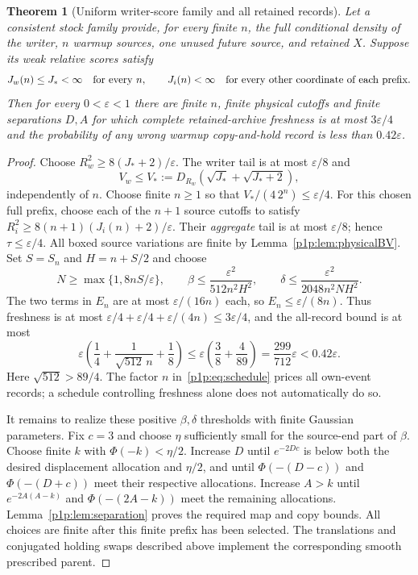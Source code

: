 \documentclass[11pt]{article}
\numberwithin{equation}{section}
\newtheorem{theorem}{Theorem}[section]
\theoremstyle{definition}
\theoremstyle{remark}
\begin{document}
\begin{theorem}[Uniform writer-score family and all retained records]
\label{p1p:thm:existence}
Let a consistent stock family provide, for every finite $n$, the full
conditional density of the writer, $n$ warmup sources, one unused future
source, and retained $X$. Suppose its weak relative scores satisfy
\[
 J_w(n)\leq J_*<\infty\quad\hbox{for every }n,
 \qquad J_i(n)<\infty\quad\hbox{for every other coordinate of each prefix}.
\]
Then for every $0<\varepsilon<1$ there are finite $n$, finite physical
cutoffs and finite separations $D,A$ for which complete retained-archive
freshness is at most $3\varepsilon/4$ and the probability of any wrong
warmup copy-and-hold record is less than $0.42\varepsilon$.
\end{theorem}
\begin{proof}
Choose $R_w^2\geq8(J_*+2)/\varepsilon$. The writer tail is at most
$\varepsilon/8$ and
\[
 V_w\leq V_*:=D_{R_w}(\sqrt{J_*}+\sqrt{J_*+2}),
\]
independently of $n$. Choose finite $n\geq1$ so that
$V_*/(4\,2^n)\leq\varepsilon/4$. For this chosen full prefix, choose
each of the $n+1$ source cutoffs to satisfy
$R_i^2\geq8(n+1)(J_i(n)+2)/\varepsilon$.
Their \emph{aggregate} tail is at most $\varepsilon/8$; hence
$\tau\leq\varepsilon/4$. All boxed source variations are finite by
Lemma~\ref{p1p:lem:physicalBV}. Set $S=S_n$ and $H=n+S/2$ and choose
\begin{equation}\label{p1p:eq:schedule}
 N\geq\max\{1,8nS/\varepsilon\},\qquad
 \beta\leq\frac{\varepsilon^2}{512n^2H^2},\qquad
 \delta\leq\frac{\varepsilon^2}{2048n^2NH^2}.
\end{equation}
The two terms in $E_n$ are at most $\varepsilon/(16n)$ each, so
$E_n\leq\varepsilon/(8n)$. Thus freshness is at most
$\varepsilon/4+\varepsilon/4+\varepsilon/(4n)\leq3\varepsilon/4$,
and the all-record bound is at most
\[
 \varepsilon\left(\frac14+\frac{1}{\sqrt{512}\,n}+\frac18\right)
 \leq\varepsilon\left(\frac38+\frac4{89}\right)
 =\frac{299}{712}\varepsilon<0.42\varepsilon.
\]
Here $\sqrt{512}>89/4$. The factor $n$ in~\eqref{p1p:eq:schedule}
prices all own-event records; a schedule controlling freshness alone
does not automatically do so.

It remains to realize these positive $\beta,\delta$ thresholds with
finite Gaussian parameters. Fix $c=3$ and choose $\eta$ sufficiently
small for the source-end part of $\beta$. Choose finite $k$ with
$\Phi(-k)<\eta/2$. Increase $D$ until $e^{-2Dc}$ is below both the
desired displacement allocation and $\eta/2$, and until
$\Phi(-(D-c))$ and $\Phi(-(D+c))$ meet their respective allocations.
Increase $A>k$ until $e^{-2A(A-k)}$ and $\Phi(-(2A-k))$ meet the remaining
allocations. Lemma~\ref{p1p:lem:separation} proves the required map and
copy bounds. All choices are finite after this finite prefix has been
selected. The translations and conjugated holding swaps described
above implement the corresponding smooth prescribed parent.
\end{proof}
\end{document}
